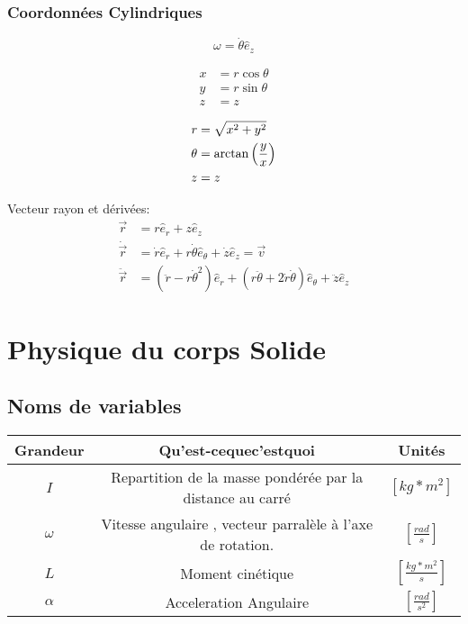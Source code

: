 \documentclass[10pt,a4paper]{article}
\begin{document}
\subsubsection{Coordonnées Cylindriques}


$$\omega = \dot\theta \hat e_z$$

\begin{multicols}{3}


\begin{align*}
x &= r  \cos\theta \\
y &= r  \sin\theta \\
z &= z
\end{align*}

\columnbreak



\columnbreak

\begin{align*}
r & = \sqrt{x^2 + y^2}\\
\theta & = \arctan\left({y \over x}\right) \\
z & = z
\end{align*}

\end{multicols}

Vecteur rayon et dérivées:
\begin{align*}
\vec{r} &= r \hat e_r + z\hat e_z \\
\dot{\vec{r}} &= \dot r \hat e_r + r \dot\theta\hat e_\theta + \dot z \hat e_z = \vec{v} \\
\ddot{\vec{r}} &= \left(\ddot r - r\dot\theta^2 \right)\hat e_r 
+ \left( r\ddot\theta + 2\dot r \dot \theta \right) \hat e_\theta + \ddot z \hat e_z 
\end{align*}


\section{Physique du corps Solide}

\subsection{Noms de variables}

\begin{tabular}{|c|c|c|}
\hline 
Grandeur & Qu'est-cequec'estquoi & Unités \\ 
\hline 
$I$ & Repartition de la masse pondérée par la distance au carré & $[kg*m^2]$ \\ 
\hline
$\omega$ & Vitesse angulaire , vecteur parralèle à l'axe de rotation. & $[\frac{rad}{s}]$ \\ 
\hline
$L$ & Moment cinétique & $[\frac{kg*m^2}{s}]$ \\
\hline
$\alpha$ & Acceleration Angulaire & $[\frac{rad}{s^2}]$ \\
\hline
\end{tabular}
\end{document}
